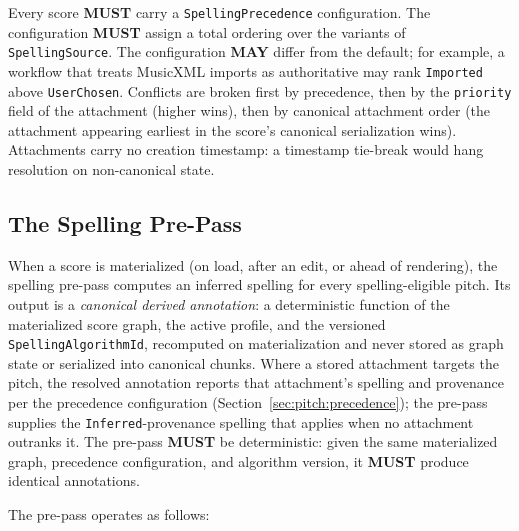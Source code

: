 \documentclass[11pt,letterpaper]{report}
\newcounter{requirement}[chapter]
\newcommand{\MUST}{\textbf{MUST}}
\newcommand{\MAY}{\textbf{MAY}}
\begin{document}
\begin{requirement}
  \label{req:pitch:spelling-precedence}
  Every score \MUST{} carry a \texttt{SpellingPrecedence} configuration.
  The configuration \MUST{} assign a total ordering over the variants of
  \texttt{SpellingSource}. The configuration \MAY{} differ from the
  default; for example, a workflow that treats MusicXML imports as
  authoritative may rank \texttt{Imported} above \texttt{UserChosen}.
  Conflicts are broken first by precedence, then by the \texttt{priority}
  field of the attachment (higher wins), then by canonical attachment
  order (the attachment appearing earliest in the score's canonical
  serialization wins). Attachments carry no creation timestamp: a
  timestamp tie-break would hang resolution on non-canonical state.
\end{requirement}

\subsection{The Spelling Pre-Pass}
\label{sec:pitch:prepass}

When a score is materialized (on load, after an edit, or ahead of
rendering), the spelling pre-pass computes an inferred spelling for
every spelling-eligible pitch. Its output is a \emph{canonical
derived annotation}: a deterministic function of the materialized
score graph, the active profile, and the versioned
\texttt{SpellingAlgorithmId}, recomputed on materialization and
never stored as graph state or serialized into canonical chunks.
Where a stored attachment targets the pitch, the resolved annotation
reports that attachment's spelling and provenance per the precedence
configuration (Section~\ref{sec:pitch:precedence}); the pre-pass
supplies the \texttt{Inferred}-provenance spelling that applies when
no attachment outranks it. The pre-pass \MUST{} be deterministic:
given the same materialized graph, precedence configuration, and
algorithm version, it \MUST{} produce identical annotations.

The pre-pass operates as follows:
\end{document}
